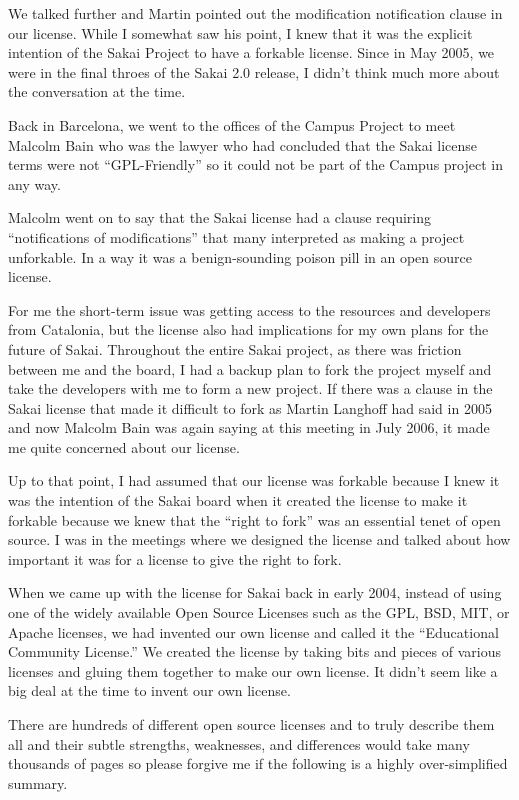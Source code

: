 \documentclass[12pt]{book}
\begin{document}
We talked further and Martin pointed out the
modification notification clause in our license.
While I somewhat saw his point, I knew that it was
the explicit intention of the Sakai Project to
have a forkable license.  Since in May 2005, we
were in the final throes of the Sakai 2.0 release,
I didn't think much more about the conversation at the
time.

Back in Barcelona, we went to the offices of the
Campus Project to meet Malcolm Bain who was
the lawyer who had concluded that the Sakai license
terms were not ``GPL-Friendly'' so it could not
be part of the Campus project in any way.

Malcolm went on to say that the Sakai license
had a clause requiring
``notifications of modifications'' that many
interpreted as making a project unforkable.  In a
way it was a benign-sounding poison pill in an
open source license.

For me the short-term issue was getting access to
the resources and developers from Catalonia, but
the license also had implications for my own
plans for the future of Sakai.  Throughout
the entire Sakai project, as there was friction
between me and the board, I had a backup plan
to fork the project myself and take the developers
with me to form a new project.  If there was a
clause in the Sakai license that made it difficult
to fork as Martin Langhoff had said in 2005 and
now Malcolm Bain was again saying at this meeting
in July 2006, it made me quite concerned
about our license.

Up to that point, I had assumed that our license
was forkable because I knew it was the intention
of the Sakai board when it created the license
to make it forkable because we knew that the
``right to fork'' was an essential tenet of
open source.  I was in the meetings where we designed
the license and talked about how important it
was for a license to give the right to fork.

When we came up with the license for Sakai
back in early 2004, instead of using one of the
widely available Open Source Licenses such
as the GPL, BSD, MIT, or Apache
licenses, we had invented our own license and called
it the ``Educational Community License.''  We created the
license by taking bits and pieces
of various licenses and gluing them together to make
our own license.  It didn't seem like a big deal at
the time to invent our own license.

There are hundreds of different open source licenses
and to truly describe them all and their subtle
strengths, weaknesses, and differences would
take many thousands of pages so please forgive me
if the following is a highly over-simplified summary.
\end{document}
